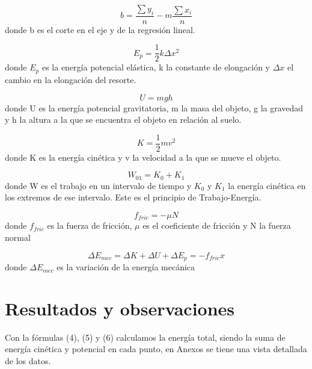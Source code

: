 \documentclass[a4paper]{article}
\begin{document}
\begin{equation}
    b=\frac{\sum y_i}{n}-m\frac{\sum x_i}{n}
\end{equation}
donde b es el corte en el eje y de la regresión lineal.

\begin{equation}
    E_p=\frac{1}{2}k\Delta x^2
\end{equation}
donde $E_p$ es la energía potencial elástica, k la constante de elongación y $\Delta x$ el cambio en la elongación del resorte. 

\begin{equation}
    U=mgh
\end{equation}
donde U es la energía potencial gravitatoria, m la masa del objeto, g la gravedad y h la altura a la que se encuentra el objeto en relación al suelo.

\begin{equation}
    K=\frac{1}{2}mv^2
\end{equation}
donde K es la energía cinética y v la velocidad a la que se mueve el objeto. 

\begin{equation}
    W_{01}=K_0+K_1
\end{equation}
donde W es el trabajo en un intervalo de tiempo y $K_0$ y $K_1$ la energía cinética en los extremos de ese intervalo. Este es el principio de Trabajo-Energía.

\begin{equation}
    f_{fric}=-\mu N
\end{equation}
    donde $f_{fric}$ es la fuerza de fricción, $\mu$ es el coeficiente de fricción y N la fuerza normal

\begin{equation}
    \Delta E_{mec}=\Delta K+\Delta U+\Delta E_p=-f_{fric}x
\end{equation}
donde $\Delta E_{mec}$ es la variación de la energía mecánica

\section{Resultados y observaciones}
Con la fórmulas (4), (5) y (6) calculamos la energía total, siendo la suma de energía cinética y potencial en cada punto, en Anexos se tiene una vista detallada de los datos.
\end{document}

